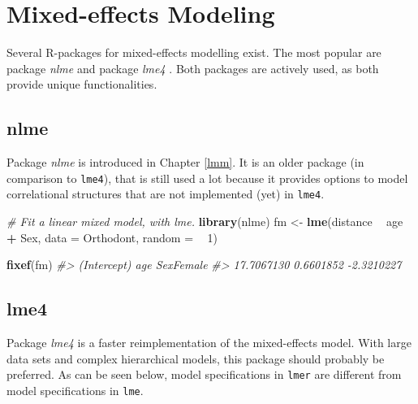 \documentclass[]{book}
\newenvironment{Shaded}{\begin{snugshade}}{\end{snugshade}}
\newcommand{\KeywordTok}[1]{\textcolor[rgb]{0.13,0.29,0.53}{\textbf{#1}}}
\newcommand{\DataTypeTok}[1]{\textcolor[rgb]{0.13,0.29,0.53}{#1}}
\newcommand{\DecValTok}[1]{\textcolor[rgb]{0.00,0.00,0.81}{#1}}
\newcommand{\StringTok}[1]{\textcolor[rgb]{0.31,0.60,0.02}{#1}}
\newcommand{\CommentTok}[1]{\textcolor[rgb]{0.56,0.35,0.01}{\textit{#1}}}
\newcommand{\OperatorTok}[1]{\textcolor[rgb]{0.81,0.36,0.00}{\textbf{#1}}}
\newcommand{\NormalTok}[1]{#1}
\begin{document}
\section{Mixed-effects Modeling}\label{mixed-effects-modeling}


Several R-packages for mixed-effects modelling exist. The most popular
are package \emph{nlme} \citep{R-nlme} and package \emph{lme4}
\citep{Bates2015}. Both packages are actively used, as both provide
unique functionalities.

\subsection{nlme}\label{nlme}


Package \emph{nlme} is introduced in Chapter \ref{lmm}. It is an older
package (in comparison to \texttt{lme4}), that is still used a lot
because it provides options to model correlational structures that are
not implemented (yet) in \texttt{lme4}.

\begin{Shaded}
\begin{Highlighting}[]
\CommentTok{# Fit a linear mixed model, with lme.}
\KeywordTok{library}\NormalTok{(nlme)}
\NormalTok{fm <-}\StringTok{ }\KeywordTok{lme}\NormalTok{(distance }\OperatorTok{~}\StringTok{ }\NormalTok{age }\OperatorTok{+}\StringTok{ }\NormalTok{Sex, }\DataTypeTok{data =}\NormalTok{ Orthodont, }\DataTypeTok{random =} \OperatorTok{~}\StringTok{ }\DecValTok{1}\NormalTok{)}

\KeywordTok{fixef}\NormalTok{(fm)}
\CommentTok{#> (Intercept)         age   SexFemale }
\CommentTok{#>  17.7067130   0.6601852  -2.3210227}
\end{Highlighting}
\end{Shaded}

\subsection{lme4}\label{lme4}


Package \emph{lme4} \citep{Bates2015} is a faster reimplementation of
the mixed-effects model. With large data sets and complex hierarchical
models, this package should probably be preferred. As can be seen below,
model specifications in \texttt{lmer} are different from model
specifications in \texttt{lme}.
\end{document}
